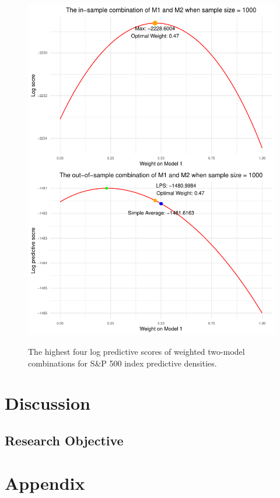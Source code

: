 \documentclass{monashthesis}
\begin{document}
\begin{figure}
\centering
\caption{The highest four log predictive scores of weighted two-model combinations for S\&P 500 index predictive densities.}
\includegraphics{figures/Sample_Size_1000.pdf}
\label{fig:ss1000}
\end{figure}

\hypertarget{discussion}{%
\chapter{Discussion}\label{discussion}}

\hypertarget{research-objective-1}{%
\section{Research Objective}\label{research-objective-1}}

\appendix

\hypertarget{appendix}{%
\chapter{Appendix}\label{appendix}}
\end{document}
